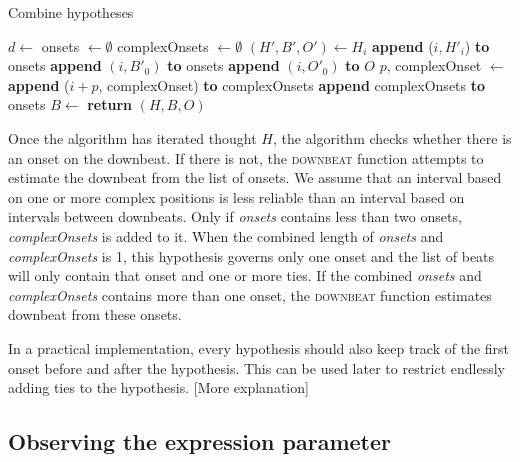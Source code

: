 \begin{algorithm}
\caption{Combine hypotheses}
\label{alg:combination}
\begin{algorithmic}
	\State $d \leftarrow$ 
	\State onsets $\leftarrow \emptyset$
	\State complexOnsets $\leftarrow \emptyset$
		\State $(H', B', O') \leftarrow H_i$
			\State \textbf{append} ($i, H'_i$) \textbf{to} onsets
		\Else
				\State \textbf{append} $(i, B'_0)$ \textbf{to} onsets
				\State \textbf{append} $(i, O'_0)$ \textbf{to} $O$
			\EndIf
			\Else
				\State $p$, complexOnset $\leftarrow$ 
				\State \textbf{append} ($i + p$, complexOnset) \textbf{to} complexOnsets
			\EndIf
		\EndIf
	\EndFor
		\State \textbf{append} complexOnsets \textbf{to} onsets
	\EndIf
	\State $B \leftarrow$ 
	\State \textbf{return} $(H, B, O)$
\EndFunction
\end{algorithmic}
\end{algorithm}

Once the algorithm has iterated thought $H$, the algorithm checks whether there is an onset on the downbeat. If there is not, the \textsc{downbeat} function attempts to estimate the downbeat from the list of onsets. We assume that an interval based on one or more complex positions is less reliable than an interval based on intervals between downbeats. Only if \textit{onsets} contains less than two onsets, \textit{complexOnsets} is added to it. When the combined length of \textit{onsets} and \textit{complexOnsets} is 1, this hypothesis governs only one onset and the list of beats will only contain that onset and one or more ties. If the combined \textit{onsets} and \textit{complexOnsets} contains more than one onset, the \textsc{downbeat} function estimates downbeat from these onsets.

In a practical implementation, every hypothesis should also keep track of the first onset before and after the hypothesis. This can be used later to restrict endlessly adding ties to the hypothesis. [More explanation]

\subsection{Observing the expression parameter}
\label{sec:observations}


